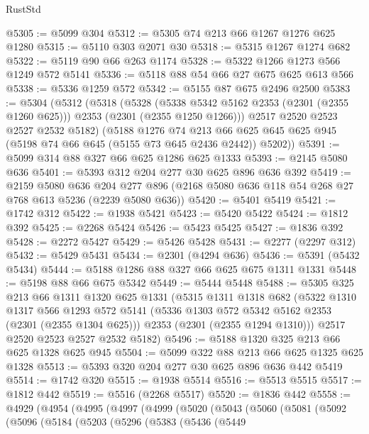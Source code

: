 \begin{lexlean}{RustStd}
\begin{coremodule}
{\begin{coremodule}
{{{{{{{{{{{{{@5305 := @5099 @304
@5312 := @5305 @74 @213 @66 @1267 @1276 @625 @1280
@5315 := @5110 @303 @2071 @30
@5318 := @5315 @1267 @1274 @682
@5322 := @5119 @90 @66 @263 @1174
@5328 := @5322 @1266 @1273 @566 @1249 @572 @5141
@5336 := @5118 @88 @54 @66 @27 @675 @625 @613 @566
@5338 := @5336 @1259 @572
@5342 := @5155 @87 @675 @2496 @2500
@5383 := @5304
    (@5312
      (@5318
        (@5328
          (@5338 @5342 @5162 @2353 (@2301 (@2355 @1260 @625)))
          @2353
          (@2301 (@2355 @1250 @1266)))
        @2517
        @2520
        @2523
        @2527
        @2532
        @5182)
      (@5188
        @1276
        @74
        @213
        @66
        @625
        @645
        @625
        @945
        (@5198 @74 @66 @645 (@5155 @73 @645 @2436 @2442))
        @5202))
@5391 := @5099 @314 @88 @327 @66 @625 @1286 @625 @1333
@5393 := @2145 @5080 @636
@5401 := @5393 @312 @204 @277 @30 @625 @896 @636 @392
@5419 := @2159
    @5080
    @636
    @204
    @277
    @896
    (@2168 @5080 @636 @118 @54 @268 @27 @768 @613 @5236 (@2239 @5080 @636))
@5420 := @5401 @5419
@5421 := @1742 @312
@5422 := @1938 @5421
@5423 := @5420 @5422
@5424 := @1812 @392
@5425 := @2268 @5424
@5426 := @5423 @5425
@5427 := @1836 @392
@5428 := @2272 @5427
@5429 := @5426 @5428
@5431 := @2277 (@2297 @312)
@5432 := @5429 @5431
@5434 := @2301 (@4294 @636)
@5436 := @5391 (@5432 @5434)
@5444 := @5188 @1286 @88 @327 @66 @625 @675 @1311 @1331
@5448 := @5198 @88 @66 @675 @5342
@5449 := @5444 @5448
@5488 := @5305
    @325
    @213
    @66
    @1311
    @1320
    @625
    @1331
    (@5315
      @1311
      @1318
      @682
      (@5322
        @1310
        @1317
        @566
        @1293
        @572
        @5141
        (@5336 @1303 @572 @5342 @5162 @2353 (@2301 (@2355 @1304 @625)))
        @2353
        (@2301 (@2355 @1294 @1310)))
      @2517
      @2520
      @2523
      @2527
      @2532
      @5182)
@5496 := @5188 @1320 @325 @213 @66 @625 @1328 @625 @945
@5504 := @5099 @322 @88 @213 @66 @625 @1325 @625 @1328
@5513 := @5393 @320 @204 @277 @30 @625 @896 @636 @442 @5419
@5514 := @1742 @320
@5515 := @1938 @5514
@5516 := @5513 @5515
@5517 := @1812 @442
@5519 := @5516 (@2268 @5517)
@5520 := @1836 @442
@5558 := @4929
    (@4954
      (@4995
        (@4997
          (@4999
            (@5020
              (@5043
                (@5060
                  (@5081
                    (@5092
                      (@5096
                        (@5184
                          (@5203
                            (@5296
                              (@5383
                                (@5436
                                  (@5449
}}}}}}}}}}}}}
\end{coremodule}}
\end{coremodule}
\end{lexlean}

